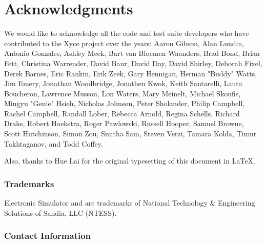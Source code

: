 


\chapter*{Acknowledgments}

We would like to acknowledge all the code and test suite developers who have
contributed to the Xyce project over the years: 
Aaron Gibson,
Alan Lundin,
Antonio Gonzales,
Ashley Meek,
Bart van Bloemen Waanders,
Brad Bond,
Brian Fett,
Christina Warrender,
David Baur,
David Day,
David Shirley,
Deborah Fixel,
Derek Barnes,
Eric Rankin,
Erik Zeek,
Gary Hennigan,
Herman "Buddy" Watts,
Jim Emery,
Jonathan Woodbridge,
Jonathen Kwok,
Keith Santarelli,
Laura Boucheron,
Lawrence Musson,
Lon Waters,
Mary Meinelt,
Michael Skoufis,
Mingyu \mbox{"Genie"} Hsieh,
Nicholas Johnson,
Peter Sholander,
Philip Campbell,
Rachel Campbell,
Randall Lober,
Rebecca Arnold,
Regina Schells,
Richard Drake,
Robert Hoekstra,
Roger Pawlowski,
Russell Hooper,
Samuel Browne,
Scott Hutchinson,
Simon Zou,
Smitha Sam,
Steven Verzi,
Tamara Kolda,
Timur Takhtaganov, and
Todd Coffey.

\noindent
Also, thanks to Hue Lai for the original typesetting of this document in \LaTeX.

\subsection*{Trademarks}

\Xyce{} Electronic Simulator\textsuperscript{\scriptsize{\texttrademark}} and
\XyceTM{} are trademarks of National Technology \& Engineering Solutions of
Sandia, LLC (NTESS).

\subsection*{Contact Information} \label{Contact Information}

